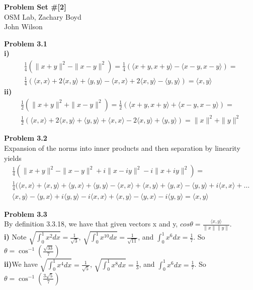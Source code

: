 \documentclass[letterpaper,12pt]{article}
\theoremstyle{definition}
\begin{document}
\begin{flushleft}
  \textbf{\large{Problem Set \#[2]}} \\
  OSM Lab, Zachary Boyd \\
  John Wilson
\end{flushleft}

\vspace{5mm}

\noindent\textbf{Problem 3.1}\\
\textbf{i)}
\begin{multline*}
\frac{1}{4} ( \| x+y \|^2 - \| x - y \|^2) = \frac{1}{4}( \langle x+y,x+y \rangle - \langle x-y,x-y \rangle ) = \\ \frac{1}{4}(\langle x,x \rangle + 2 \langle x,y \rangle + \langle y,y \rangle - \langle x,x \rangle + 2 \langle x,y \rangle - \langle y,y \rangle) = \langle x,y \rangle
\end{multline*}
\textbf{ii)}
\begin{multline*}
\frac{1}{2} ( \| x+y \|^2 + \| x-y \|^2) = \frac{1}{2}(\langle x+y,x+y \rangle + \langle x-y,x-y \rangle) =\\ \frac{1}{2}( \langle x,x \rangle + 2\langle x,y \rangle + \langle y,y \rangle + \langle x,x \rangle -2\langle x,y \rangle + \langle y,y \rangle) = \|x\|^2 + \|y\|^2
\end{multline*}

\noindent\textbf{Problem 3.2}\\
Expansion of the norms into inner products and then separation by linearity yields
\begin{multline*}
\frac{1}{4}(\| x+y \|^2 - \| x - y \|^2 + i \|x - i y \|^2 - i \| x + i y \|^2) = \\ 
\frac {1}{4}(\langle x,x \rangle +\langle x,y \rangle + \langle y,x \rangle + \langle y,y \rangle - \langle x,x \rangle  + \langle x,y \rangle + \langle y,x \rangle - \langle y,y \rangle + i \langle x,x \rangle + \ldots \\ \langle x,y \rangle - \langle y,x \rangle + i \langle y,y \rangle - i \langle x,x \rangle + \langle x,y \rangle - \langle y,x \rangle - i \langle y,y \rangle = \langle x,y \rangle
\end{multline*}

\noindent\textbf{Problem 3.3}\\
By definition 3.3.18, we have that given vectors x and y, $cos \theta = \frac{\langle x, y \rangle}{\| x \| \| y \|}$.\\
\textbf{i)} Note $\sqrt{\int_0^1 x^2 dx} = \frac{1}{\sqrt{3}}$, $\sqrt{\int_0^1 x^{10} dx} = \frac{1}{\sqrt{11}}$, and $\int_0^1 x^6 dx = \frac{1}{7}$. So $\theta = \cos^{-1}\left( \frac{\sqrt{33}}{7}\right)$\\
\textbf{ii)}We have $\sqrt{\int_0^1 x^4 dx} = \frac{1}{\sqrt{5}}$, $\sqrt{\int_0^1 x^{8} dx} = \frac{1}{3}$, and $\int_0^1 x^6 dx = \frac{1}{7}$. So $\theta = \cos^{-1}\left( \frac{3\sqrt{5}}{7}\right)$\\
\end{document}

